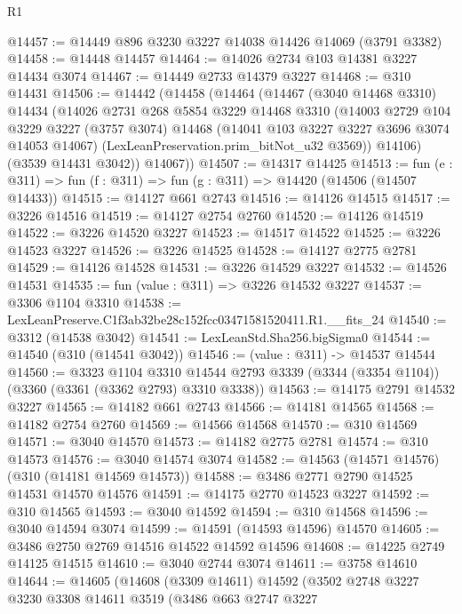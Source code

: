 \begin{lexlean}{R1}
\begin{coremodule}
@14457 := @14449 @896 @3230 @3227 @14038 @14426 @14069 (@3791 @3382)
@14458 := @14448 @14457
@14464 := @14026 @2734 @103 @14381 @3227 @14434 @3074
@14467 := @14449 @2733 @14379 @3227
@14468 := @310 @14431
@14506 := @14442
    (@14458
      (@14464
        (@14467
          (@3040 @14468 @3310)
          @14434
          (@14026
            @2731
            @268
            @5854
            @3229
            @14468
            @3310
            (@14003
              @2729
              @104
              @3229
              @3227
              (@3757 @3074)
              @14468
              (@14041 @103 @3227 @3227 @3696 @3074 @14053 @14067)
              (LexLeanPreservation.prim_bitNot_u32 @3569))
            @14106)
          (@3539 @14431 @3042))
        @14067))
@14507 := @14317 @14425
@14513 := fun (e : @311) => fun (f : @311) => fun (g : @311) => @14420 (@14506 (@14507 @14433))
@14515 := @14127 @661 @2743
@14516 := @14126 @14515
@14517 := @3226 @14516
@14519 := @14127 @2754 @2760
@14520 := @14126 @14519
@14522 := @3226 @14520 @3227
@14523 := @14517 @14522
@14525 := @3226 @14523 @3227
@14526 := @3226 @14525
@14528 := @14127 @2775 @2781
@14529 := @14126 @14528
@14531 := @3226 @14529 @3227
@14532 := @14526 @14531
@14535 := fun (value : @311) => @3226 @14532 @3227
@14537 := @3306 @1104 @3310
@14538 := LexLeanPreserve.C1f3ab32be28c152fcc03471581520411.R1.__fits_24
@14540 := @3312 (@14538 @3042)
@14541 := LexLeanStd.Sha256.bigSigma0
@14544 := @14540 (@310 (@14541 @3042))
@14546 := (value : @311) -> @14537 @14544
@14560 := @3323
    @1104
    @3310
    @14544
    @2793
    @3339
    (@3344 (@3354 @1104))
    (@3360 (@3361 (@3362 @2793) @3310 @3338))
@14563 := @14175 @2791 @14532 @3227
@14565 := @14182 @661 @2743
@14566 := @14181 @14565
@14568 := @14182 @2754 @2760
@14569 := @14566 @14568
@14570 := @310 @14569
@14571 := @3040 @14570
@14573 := @14182 @2775 @2781
@14574 := @310 @14573
@14576 := @3040 @14574 @3074
@14582 := @14563 (@14571 @14576) (@310 (@14181 @14569 @14573))
@14588 := @3486 @2771 @2790 @14525 @14531 @14570 @14576
@14591 := @14175 @2770 @14523 @3227
@14592 := @310 @14565
@14593 := @3040 @14592
@14594 := @310 @14568
@14596 := @3040 @14594 @3074
@14599 := @14591 (@14593 @14596) @14570
@14605 := @3486 @2750 @2769 @14516 @14522 @14592 @14596
@14608 := @14225 @2749 @14125 @14515
@14610 := @3040 @2744 @3074
@14611 := @3758 @14610
@14644 := @14605
    (@14608
      (@3309 @14611)
      @14592
      (@3502
        @2748
        @3227
        @3230
        @3308
        @14611
        @3519
        (@3486
          @663
          @2747
          @3227

\end{coremodule}
\end{lexlean}
